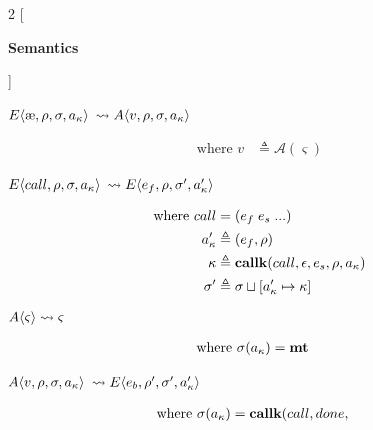 \documentclass[12pt,draft]{article}
\newcommand\mae{\ensuremath{\text{\ae}}}
\newcommand{\E}[4]{E\langle #1 , #2 , #3 , #4 \rangle}
\newcommand{\A}[4]{A\langle #1 , #2 , #3 , #4 \rangle}
\begin{document}
\begin{multicols*}{2}
  [
  \begin{center}
    \textbf{Semantics} \\
  \end{center}
  ]
  \begin{center}
    $\E{\mae}{\cenv}{\cstore}{\ckaddr}$
    $\leadsto \A{v}{\cenv}{\cstore}{\ckaddr}$
  \end{center}
  \vspace{-7mm}
  \begin{align*}
    \text{where } v &\triangleq \mathcal{A}(\varsigma)
  \end{align*}
  \begin{center}
    $\E{call}{\cenv}{\cstore}{\ckaddr}$
    $\leadsto \E{e_f}{\cenv}{\cstore'}{\ckaddr'}$
  \end{center}
  \vspace{-7mm}
  \begin{align*}
    \text{where }
    call &= (e_f \; e_s \; ...) \\
    a_{\kappa}' &\triangleq (e_f , \rho) \\
    \kappa &\triangleq \textbf{callk}(call , \epsilon , e_s , \rho , a_{\kappa}) \\
    \sigma' &\triangleq \sigma \sqcup [a_{\kappa}' \mapsto \kappa]
  \end{align*}
  \vfill\null
  \columnbreak
  \begin{center}
    $ A\langle \varsigma \rangle \leadsto \varsigma $
  \end{center}
  \vspace{-7mm}
  \begin{align*}
    \text{where }
    \sigma(a_{\kappa}) &= \textbf{mt}
  \end{align*}
  \begin{center}
    $\A{v}{\cenv}{\cstore}{\ckaddr}$
    $\leadsto \E{e_b}{\cenv'}{\cstore'}{\ckaddr'}$
  \end{center}
  \vspace{-7mm}
  \begin{align*}
    \text{where }
    \cstore(\ckaddr) &= \textbf{callk}(call, done ,

\end{align*}
\end{multicols*}
\end{document}
